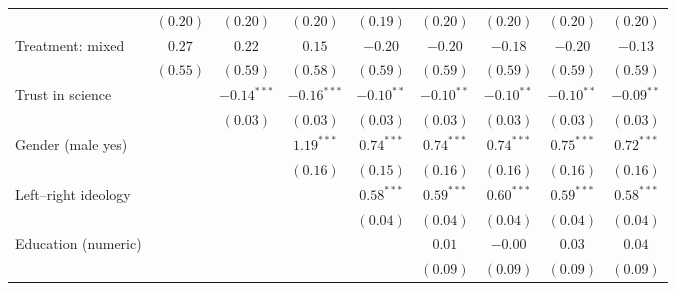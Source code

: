 \begin{table}[h]
\begin{center}
\begin{tabular}{l c c c c c c c c}
                                                                                & $(0.20)$     & $(0.20)$      & $(0.20)$      & $(0.19)$      & $(0.20)$      & $(0.20)$      & $(0.20)$      & $(0.20)$      \\
Treatment: mixed                                                                & $0.27$       & $0.22$        & $0.15$        & $-0.20$       & $-0.20$       & $-0.18$       & $-0.20$       & $-0.13$       \\
                                                                                & $(0.55)$     & $(0.59)$      & $(0.58)$      & $(0.59)$      & $(0.59)$      & $(0.59)$      & $(0.59)$      & $(0.59)$      \\
Trust in science                                                                &              & $-0.14^{***}$ & $-0.16^{***}$ & $-0.10^{**}$  & $-0.10^{**}$  & $-0.10^{**}$  & $-0.10^{**}$  & $-0.09^{**}$  \\
                                                                                &              & $(0.03)$      & $(0.03)$      & $(0.03)$      & $(0.03)$      & $(0.03)$      & $(0.03)$      & $(0.03)$      \\
Gender (male yes)                                                               &              &               & $1.19^{***}$  & $0.74^{***}$  & $0.74^{***}$  & $0.74^{***}$  & $0.75^{***}$  & $0.72^{***}$  \\
                                                                                &              &               & $(0.16)$      & $(0.15)$      & $(0.16)$      & $(0.16)$      & $(0.16)$      & $(0.16)$      \\
Left–right ideology                                                             &              &               &               & $0.58^{***}$  & $0.59^{***}$  & $0.60^{***}$  & $0.59^{***}$  & $0.58^{***}$  \\
                                                                                &              &               &               & $(0.04)$      & $(0.04)$      & $(0.04)$      & $(0.04)$      & $(0.04)$      \\
Education (numeric)                                                             &              &               &               &               & $0.01$        & $-0.00$       & $0.03$        & $0.04$        \\
                                                                                &              &               &               &               & $(0.09)$      & $(0.09)$      & $(0.09)$      & $(0.09)$      \\

\end{tabular}
\end{center}
\end{table}
